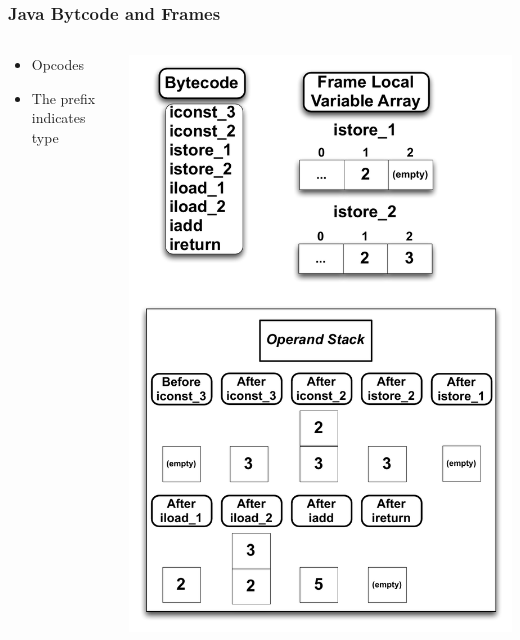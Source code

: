 \documentclass{beamer}
\begin{document}
\begin{frame}
\frametitle{Java Bytcode and Frames}
\begin{columns}
\begin{column}{0.5\textwidth}
\begin{itemize}	
\item Opcodes
\item The prefix indicates type
\end{itemize}
\end{column}

\begin{column}{0.5\textwidth}
\includegraphics[height=.8\textheight]{Illustrations/stackBytecode.pdf}
\end{column}
\end{columns}
\end{frame}
\end{document}
